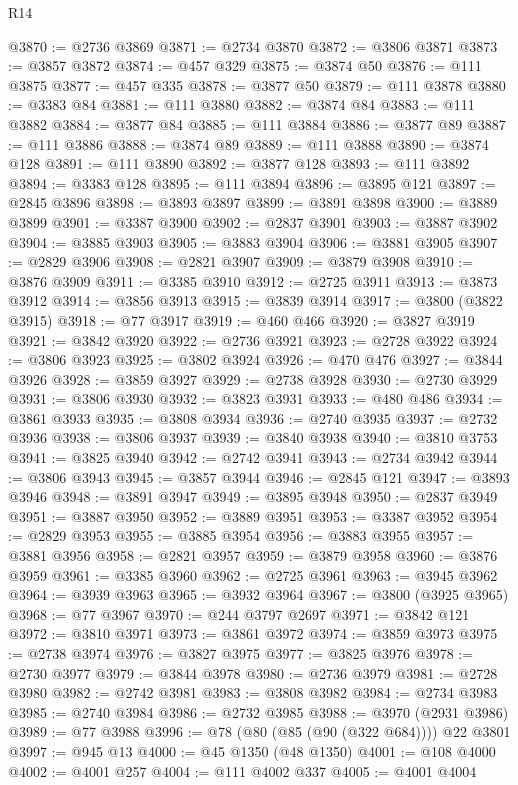 \begin{lexlean}{R14}
\begin{coremodule}
@3870 := @2736 @3869
@3871 := @2734 @3870
@3872 := @3806 @3871
@3873 := @3857 @3872
@3874 := @457 @329
@3875 := @3874 @50
@3876 := @111 @3875
@3877 := @457 @335
@3878 := @3877 @50
@3879 := @111 @3878
@3880 := @3383 @84
@3881 := @111 @3880
@3882 := @3874 @84
@3883 := @111 @3882
@3884 := @3877 @84
@3885 := @111 @3884
@3886 := @3877 @89
@3887 := @111 @3886
@3888 := @3874 @89
@3889 := @111 @3888
@3890 := @3874 @128
@3891 := @111 @3890
@3892 := @3877 @128
@3893 := @111 @3892
@3894 := @3383 @128
@3895 := @111 @3894
@3896 := @3895 @121
@3897 := @2845 @3896
@3898 := @3893 @3897
@3899 := @3891 @3898
@3900 := @3889 @3899
@3901 := @3387 @3900
@3902 := @2837 @3901
@3903 := @3887 @3902
@3904 := @3885 @3903
@3905 := @3883 @3904
@3906 := @3881 @3905
@3907 := @2829 @3906
@3908 := @2821 @3907
@3909 := @3879 @3908
@3910 := @3876 @3909
@3911 := @3385 @3910
@3912 := @2725 @3911
@3913 := @3873 @3912
@3914 := @3856 @3913
@3915 := @3839 @3914
@3917 := @3800 (@3822 @3915)
@3918 := @77 @3917
@3919 := @460 @466
@3920 := @3827 @3919
@3921 := @3842 @3920
@3922 := @2736 @3921
@3923 := @2728 @3922
@3924 := @3806 @3923
@3925 := @3802 @3924
@3926 := @470 @476
@3927 := @3844 @3926
@3928 := @3859 @3927
@3929 := @2738 @3928
@3930 := @2730 @3929
@3931 := @3806 @3930
@3932 := @3823 @3931
@3933 := @480 @486
@3934 := @3861 @3933
@3935 := @3808 @3934
@3936 := @2740 @3935
@3937 := @2732 @3936
@3938 := @3806 @3937
@3939 := @3840 @3938
@3940 := @3810 @3753
@3941 := @3825 @3940
@3942 := @2742 @3941
@3943 := @2734 @3942
@3944 := @3806 @3943
@3945 := @3857 @3944
@3946 := @2845 @121
@3947 := @3893 @3946
@3948 := @3891 @3947
@3949 := @3895 @3948
@3950 := @2837 @3949
@3951 := @3887 @3950
@3952 := @3889 @3951
@3953 := @3387 @3952
@3954 := @2829 @3953
@3955 := @3885 @3954
@3956 := @3883 @3955
@3957 := @3881 @3956
@3958 := @2821 @3957
@3959 := @3879 @3958
@3960 := @3876 @3959
@3961 := @3385 @3960
@3962 := @2725 @3961
@3963 := @3945 @3962
@3964 := @3939 @3963
@3965 := @3932 @3964
@3967 := @3800 (@3925 @3965)
@3968 := @77 @3967
@3970 := @244 @3797 @2697
@3971 := @3842 @121
@3972 := @3810 @3971
@3973 := @3861 @3972
@3974 := @3859 @3973
@3975 := @2738 @3974
@3976 := @3827 @3975
@3977 := @3825 @3976
@3978 := @2730 @3977
@3979 := @3844 @3978
@3980 := @2736 @3979
@3981 := @2728 @3980
@3982 := @2742 @3981
@3983 := @3808 @3982
@3984 := @2734 @3983
@3985 := @2740 @3984
@3986 := @2732 @3985
@3988 := @3970 (@2931 @3986)
@3989 := @77 @3988
@3996 := @78 (@80 (@85 (@90 (@322 @684)))) @22 @3801
@3997 := @945 @13
@4000 := @45 @1350 (@48 @1350)
@4001 := @108 @4000
@4002 := @4001 @257
@4004 := @111 @4002 @337
@4005 := @4001 @4004

\end{coremodule}
\end{lexlean}
